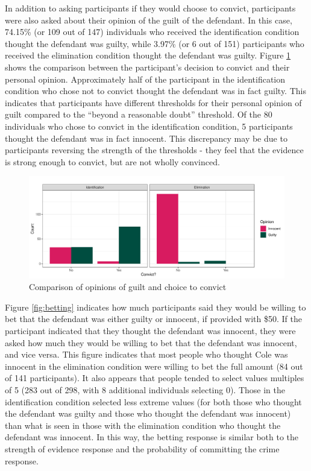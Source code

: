 \documentclass[print]{nuthesis}
\begin{document}
In addition to asking participants if they would choose to convict, participants were also asked about their opinion of the guilt of the defendant.
In this case, 74.15\% (or 109 out of 147) individuals who received the identification condition thought the defendant was guilty, while 3.97\% (or 6 out of 151) participants who received the elimination condition thought the defendant was guilty.
Figure \ref{fig:opinionguilt} shows the comparison between the participant's decision to convict and their personal opinion.
Approximately half of the participant in the identification condition who chose not to convict thought the defendant was in fact guilty.
This indicates that participants have different thresholds for their personal opinion of guilt compared to the ``beyond a reasonable doubt'' threshold.
Of the 80 individuals who chose to convict in the identification condition, 5 participants thought the defendant was in fact innocent.
This discrepancy may be due to participants reversing the strength of the thresholds - they feel that the evidence is strong enough to convict, but are not wholly convinced.

\begin{figure}

{\centering \includegraphics[width=\linewidth]{thesis_files/figure-latex/opinionguilt-1} 

}

\caption{Comparison of opinions of guilt and choice to convict}\label{fig:opinionguilt}
\end{figure}

Figure \ref{fig:betting} indicates how much participants said they would be willing to bet that the defendant was either guilty or innocent, if provided with \$50.
If the participant indicated that they thought the defendant was innocent, they were asked how much they would be willing to bet that the defendant was innocent, and vice versa.
This figure indicates that most people who thought Cole was innocent in the elimination condition were willing to bet the full amount (84 out of 141 participants).
It also appears that people tended to select values multiples of 5 (283 out of 298, with 8 additional individuals selecting 0).
Those in the identification condition selected less extreme values (for both those who thought the defendant was guilty and those who thought the defendant was innocent) than what is seen in those with the elimination condition who thought the defendant was innocent.
In this way, the betting response is similar both to the strength of evidence response and the probability of committing the crime response.
\end{document}
